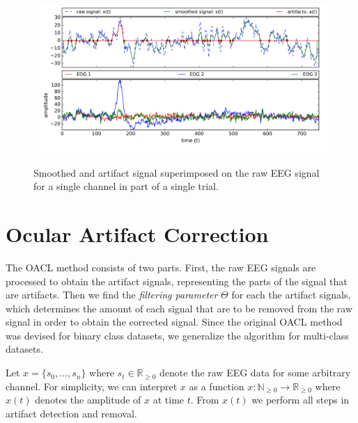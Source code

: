 \begin{figure}%
	\centering
	\includegraphics[width=1\textwidth]{figures/oacl-signals.png}
	\vspace{-2em}
	\label{fig:oacl-signals}
	\caption{Smoothed and artifact signal superimposed on the raw EEG signal for a single channel in part of a single trial.}
\end{figure}
\section{Ocular Artifact Correction}\label{sec:oacl}
The OACL method consists of two parts. First, the raw EEG signals are processed to obtain the artifact signals, representing the parts of the signal that are artifacts. Then we find the \emph{filtering parameter} $\Theta$ for each the artifact signals, which determines the amount of each signal that are to be removed from the raw signal in order to obtain the corrected signal. 
Since the original OACL method \citep{li2015ocular} was devised for binary class datasets, we generalize the algorithm for multi-class datasets. 

Let $x = \{s_0, ...,s_n\}$ where $s_t \in \mathbb{R}_{\geq 0}$ denote the raw EEG data for some arbitrary channel. For simplicity, we can interpret $x$ as a function $x : \mathbb{N}_{\geq 0} \rightarrow \mathbb{R}_{\geq 0}$ where $x(t)$ denotes the amplitude of $x$ at time $t$. 
From $x(t)$ we perform all steps in artifact detection and removal.


